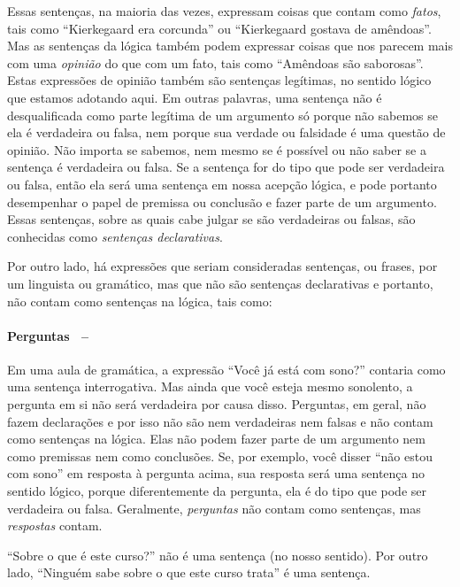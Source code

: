Essas sentenças, na maioria das vezes, expressam coisas que contam como \textit{fatos}, tais como ``Kierkegaard era corcunda'' ou ``Kierkegaard gostava de amêndoas''.
Mas as sentenças da lógica também podem expressar coisas que nos parecem mais com uma \textit{opinião} do que com um fato, tais como ``Amêndoas são saborosas''.
Estas expressões de opinião também são sentenças legítimas, no sentido lógico que estamos adotando aqui.
Em outras palavras, uma sentença não é desqualificada como parte legítima de um argumento só porque não sabemos se ela é verdadeira ou falsa, nem porque sua verdade ou falsidade é uma questão de opinião.
Não importa se sabemos, nem mesmo se é possível ou não saber se a sentença é verdadeira ou falsa.
Se a sentença for do tipo que pode ser verdadeira ou falsa, então ela será uma sentença em nossa acepção lógica, e pode portanto desempenhar o papel de premissa ou conclusão e fazer parte de um argumento.
Essas sentenças, sobre as quais cabe julgar se são verdadeiras ou falsas, são conhecidas como \emph{sentenças declarativas}.

Por outro lado, há expressões que seriam consideradas sentenças, ou frases, por um linguista ou gramático, mas que não são sentenças declarativas e portanto, não contam como sentenças na lógica, tais como:

\paragraph{Perguntas \ --}Em uma aula de gramática, a expressão ``Você já está com sono?''  contaria como uma sentença interrogativa. Mas ainda que você esteja mesmo sonolento, a pergunta em si não será verdadeira por causa disso.
Perguntas, em geral, não fazem declarações e por isso não são nem verdadeiras nem falsas e não contam como sentenças na lógica.
Elas não podem fazer parte de um argumento nem como premissas nem como conclusões.
Se, por exemplo, você disser ``não estou com sono'' em resposta à pergunta acima, sua resposta será uma sentença no sentido lógico, porque diferentemente da pergunta, ela é do tipo que pode ser verdadeira ou falsa.
Geralmente, \emph{perguntas} não contam como sentenças, mas \emph{respostas} contam.

``Sobre o que é este curso?'' não é uma sentença (no nosso sentido).
Por outro lado, ``Ninguém sabe sobre o que este curso trata'' é uma sentença.

